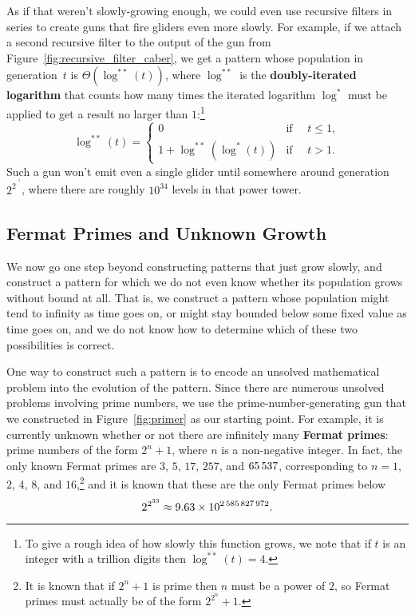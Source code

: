 As if that weren't slowly-growing enough, we could even use recursive filters in series to create guns that fire gliders even more slowly. For example, if we attach a second recursive filter to the output of the gun from Figure~\ref{fig:recursive_filter_caber}, we get a pattern whose population in generation~$t$ is $\Theta(\log^{**}(t))$, where $\log^{**}$ is the \textbf{doubly-iterated logarithm} that counts how many times the iterated logarithm $\log^*$ must be applied to get a result no larger than $1$:\footnote{To give a rough idea of how slowly this function grows, we note that if $t$ is an integer with a trillion digits then $\log^{**}(t) = 4$.}
\[
	\log^{**}(t) = \begin{cases}
		0                  & \mbox{if } \quad t \leq 1, \\
		1 + \log^{**}(\log^{*}(t)) & \mbox{if } \quad t > 1.
	\end{cases}
\]
Such a gun won't emit even a single glider until somewhere around generation~$2^{2^{\cdot^{\cdot^{2}}}}$, where there are roughly $10^{34}$ levels in that power tower.


\subsection{Fermat Primes and Unknown Growth}\label{sec:unknown_growth}

We now go one step beyond constructing patterns that just grow slowly, and construct a pattern for which we do not even know whether its population grows without bound at all. That is, we construct a pattern whose population might tend to infinity as time goes on, or might stay bounded below some fixed value as time goes on, and we do not know how to determine which of these two possibilities is correct.

One way to construct such a pattern is to encode an unsolved mathematical problem into the evolution of the pattern. Since there are numerous unsolved problems involving prime numbers, we use the prime-number-generating gun that we constructed in Figure~\ref{fig:primer} as our starting point. For example, it is currently unknown whether or not there are infinitely many \textbf{Fermat primes}: prime numbers of the form $2^n + 1$, where $n$ is a non-negative integer. In fact, the only known Fermat primes are $3$, $5$, $17$, $257$, and $65{\,}537$, corresponding to $n = 1$, $2$, $4$, $8$, and $16$,\footnote{It is known that if $2^n+1$ is prime then $n$ must be a power of $2$, so Fermat primes must actually be of the form $2^{2^n}+1$.} and it is known that these are the only Fermat primes below
\[
	2^{2^{33}} \approx 9.63 \times 10^{2{\,}585{\,}827{\,}972}.
\]

